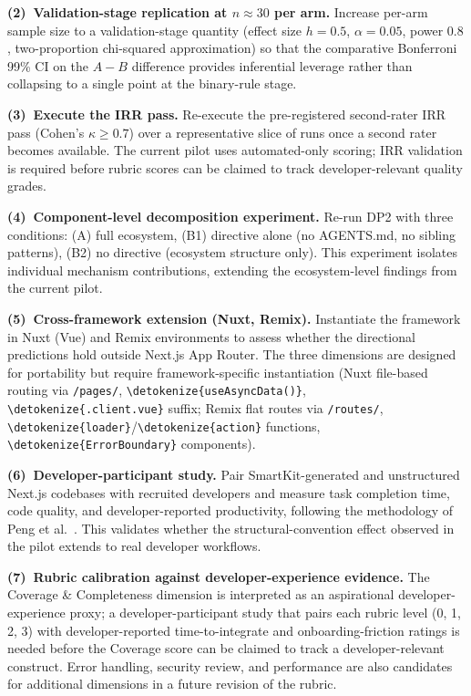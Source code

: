 \documentclass[12pt,a4paper]{report}
\newcommand{\code}[1]{\texttt{\nolinkurl{\detokenize{#1}}}}
\DeclareRobustCommand{\filename}[1]{\bgroup\urlstyle{tt}\nolinkurl{#1}\egroup}
\begin{document}
\textbf{(2)~Validation-stage replication at $n \approx 30$ per arm.} Increase per-arm sample size to a validation-stage quantity (effect size $h = 0.5$, $\alpha = 0.05$, power $0.8$, two-proportion chi-squared approximation) so that the comparative Bonferroni 99\% CI on the $A-B$ difference provides inferential leverage rather than collapsing to a single point at the binary-rule stage.

\textbf{(3)~Execute the IRR pass.} Re-execute the pre-registered second-rater IRR pass (Cohen's $\kappa \geq 0.7$) over a representative slice of runs once a second rater becomes available. The current pilot uses automated-only scoring; IRR validation is required before rubric scores can be claimed to track developer-relevant quality grades.

\textbf{(4)~Component-level decomposition experiment.} Re-run DP2 with three conditions: (A) full ecosystem, (B1) directive alone (no AGENTS.md, no sibling patterns), (B2) no directive (ecosystem structure only). This experiment isolates individual mechanism contributions, extending the ecosystem-level findings from the current pilot.

\textbf{(5)~Cross-framework extension (Nuxt, Remix).} Instantiate the framework in Nuxt (Vue) and Remix environments to assess whether the directional predictions hold outside Next.js App Router. The three dimensions are designed for portability but require framework-specific instantiation (Nuxt file-based routing via \filename{/pages/}, \code{useAsyncData()}, \code{.client.vue} suffix; Remix flat routes via \filename{/routes/}, \code{loader}/\code{action} functions, \code{ErrorBoundary} components).

\textbf{(6)~Developer-participant study.} Pair SmartKit-generated and
unstructured Next.js codebases with recruited developers and measure task
completion time, code quality, and developer-reported productivity, following
the methodology of Peng et al.\ \parencite{peng2023impact}. This validates
whether the structural-convention effect observed
in the pilot extends to real developer workflows.

\textbf{(7)~Rubric calibration against developer-experience evidence.} The Coverage \& Completeness dimension is interpreted as an aspirational developer-experience proxy; a developer-participant study that pairs each rubric level (0, 1, 2, 3) with developer-reported time-to-integrate and onboarding-friction ratings is needed before the Coverage score can be claimed to track a developer-relevant construct. Error handling, security review, and performance are also candidates for additional dimensions in a future revision of the rubric.

\printbibliography[heading=bibliography, title={Bibliography}]
\end{document}
